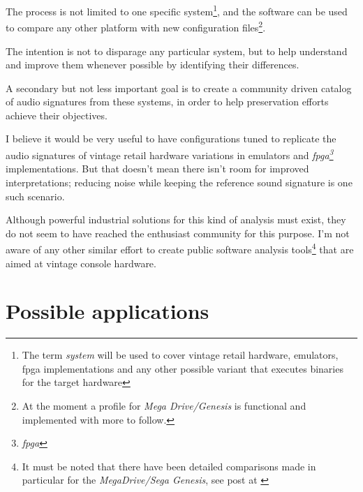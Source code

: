 \documentclass[10pt,a4paper]{report}
\newcommand{\define}[1]{\textit{\acrshort{#1}\footnote{\textit{\acrlong{#1}}}}}
\begin{document}
The process is not limited to one specific system\footnote{The term \textit{system} will be used to cover vintage retail hardware, emulators, \acrshort{fpga} implementations and any other possible variant that executes binaries for the target hardware}, and the software can be used to compare any other platform with new configuration files\footnote{At the moment a profile for \textit{Mega Drive/Genesis} is functional and implemented with more to follow.}.

The intention is not to disparage any particular system, but to help understand and improve them whenever possible by identifying their differences.

A secondary but not less important goal is to create a community driven catalog of audio signatures from these systems, in order to help preservation efforts achieve their objectives.

I believe it would be very useful to have configurations tuned to replicate the audio signatures of vintage retail hardware variations in emulators and \define{fpga} implementations. But that doesn't mean there isn't room for improved interpretations; reducing noise while keeping the reference sound signature is one such scenario.

Although powerful industrial solutions for this kind of analysis must exist, they do not seem to have reached the enthusiast community for this purpose. I'm not aware of any other similar effort to create public software analysis tools\footnote{It must be noted that there have been detailed comparisons made in particular for the \textit{MegaDrive/Sega Genesis}, see post at \cite{genesisaudio}} that are aimed at vintage console hardware. 

\section{Possible applications}
\end{document}
